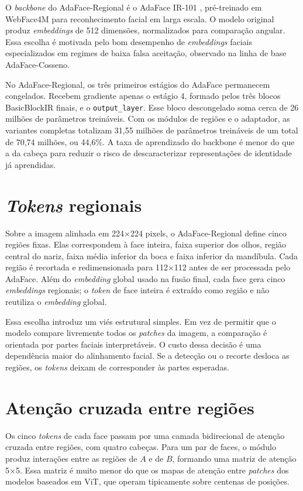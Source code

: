 O \textit{backbone} do AdaFace-Regional é o AdaFace IR-101 \cite{kim2022adaface}, pré-treinado em WebFace4M para reconhecimento facial em larga escala. O modelo original produz \textit{embeddings} de 512 dimensões, normalizados para comparação angular. Essa escolha é motivada pelo bom desempenho de \textit{embeddings} faciais especializados em regimes de baixa falsa aceitação, observado na linha de base AdaFace-Cosseno.

No AdaFace-Regional, os três primeiros estágios do AdaFace permanecem congelados. Recebem gradiente apenas o estágio 4, formado pelos três blocos BasicBlockIR finais, e o \texttt{output\_layer}. Esse bloco descongelado soma cerca de 26 milhões de parâmetros treináveis. Com os módulos de regiões e o adaptador, as variantes completas totalizam 31,55 milhões de parâmetros treináveis de um total de 70,74 milhões, ou 44,6\%. A taxa de aprendizado do backbone é menor do que a da cabeça para reduzir o risco de descaracterizar representações de identidade já aprendidas.

\section{\textit{Tokens} regionais}

Sobre a imagem alinhada em 224$\times$224 pixels, o AdaFace-Regional define cinco regiões fixas. Elas correspondem à face inteira, faixa superior dos olhos, região central do nariz, faixa média inferior da boca e faixa inferior da mandíbula. Cada região é recortada e redimensionada para 112$\times$112 antes de ser processada pelo AdaFace. Além do \textit{embedding} global usado na fusão final, cada face gera cinco \textit{embeddings} regionais; o \textit{token} de face inteira é extraído como região e não reutiliza o \textit{embedding} global.

Essa escolha introduz um viés estrutural simples. Em vez de permitir que o modelo compare livremente todos os \textit{patches} da imagem, a comparação é orientada por partes faciais interpretáveis. O custo dessa decisão é uma dependência maior do alinhamento facial. Se a detecção ou o recorte desloca as regiões, os \textit{tokens} deixam de corresponder às partes esperadas.

\section{Atenção cruzada entre regiões}

Os cinco \textit{tokens} de cada face passam por uma camada bidirecional de atenção cruzada entre regiões, com quatro cabeças. Para um par de faces, o módulo produz interações entre as regiões de $A$ e de $B$, formando uma matriz de atenção 5$\times$5. Essa matriz é muito menor do que os mapas de atenção entre \textit{patches} dos modelos baseados em ViT, que operam tipicamente sobre centenas de posições.

